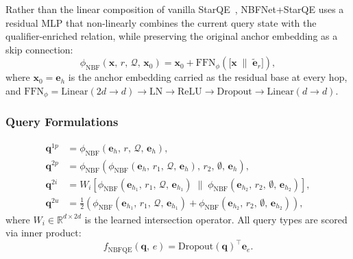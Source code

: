 \documentclass[10pt,journal,compsoc]{IEEEtran}
\begin{document}
Rather than the linear composition of vanilla
StarQE~\cite{starqe}, NBFNet+StarQE uses a residual
MLP that non-linearly combines the current query state
with the qualifier-enriched relation, while preserving
the original anchor embedding as a skip connection:
\begin{equation}
  \phi_{\mathrm{NBF}}(\mathbf{x},\, r,\,
  \mathcal{Q},\, \mathbf{x}_0)
  = \mathbf{x}_0
    + \mathrm{FFN}_\phi\!\left(
        \bigl[\mathbf{x}
        \;\|\; \tilde{\mathbf{e}}_r\bigr]
      \right),
  \label{eq:nbfqe_compose}
\end{equation}
where $\mathbf{x}_0 = \mathbf{e}_h$ is the anchor
embedding carried as the residual base at every hop, and
$\mathrm{FFN}_\phi =
 \mathrm{Linear}(2d{\to}d)
 \to \mathrm{LN}
 \to \mathrm{ReLU}
 \to \mathrm{Dropout}
 \to \mathrm{Linear}(d{\to}d)$.

\subsubsection{Query Formulations}
\label{sssec:nbfqe_forms}

\begin{align}
  \mathbf{q}^{1p}
  &= \phi_{\mathrm{NBF}}
    (\mathbf{e}_h,\, r,\, \mathcal{Q},\, \mathbf{e}_h),
  \label{eq:nbfqe_1p} \\[4pt]
  \mathbf{q}^{2p}
  &= \phi_{\mathrm{NBF}}\!\left(
       \phi_{\mathrm{NBF}}(
         \mathbf{e}_h,\, r_1,\, \mathcal{Q},\,
         \mathbf{e}_h),\,
       r_2,\, \emptyset,\, \mathbf{e}_h
     \right),
  \label{eq:nbfqe_2p} \\[4pt]
  \mathbf{q}^{2i}
  &= W_i\!\left[
       \phi_{\mathrm{NBF}}(
         \mathbf{e}_{h_1},\, r_1,\, \mathcal{Q},\,
         \mathbf{e}_{h_1})
       \;\|\;
       \phi_{\mathrm{NBF}}(
         \mathbf{e}_{h_2},\, r_2,\, \emptyset,\,
         \mathbf{e}_{h_2})
     \right],
  \label{eq:nbfqe_2i} \\[4pt]
  \mathbf{q}^{2u}
  &= \tfrac{1}{2}\!\left(
       \phi_{\mathrm{NBF}}(
         \mathbf{e}_{h_1},\, r_1,\, \mathcal{Q},\,
         \mathbf{e}_{h_1})
       +
       \phi_{\mathrm{NBF}}(
         \mathbf{e}_{h_2},\, r_2,\, \emptyset,\,
         \mathbf{e}_{h_2})
     \right),
  \label{eq:nbfqe_2u}
\end{align}
where $W_i \in \mathbb{R}^{d \times 2d}$ is the learned
intersection operator.
All query types are scored via inner product:
\begin{equation}
  f_{\mathrm{NBFQE}}(\mathbf{q},\, e)
  = \mathrm{Dropout}(\mathbf{q})^{\top} \mathbf{e}_e.
  \label{eq:nbfqe_score}
\end{equation}
\end{document}
